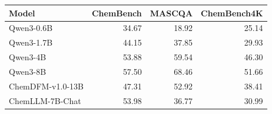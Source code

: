 \begin{tabular}{lrrr}
\hline
Model & ChemBench & MASCQA & ChemBench4K \\
\hline
Qwen3-0.6B & 34.67 & 18.92 & 25.14 \\
Qwen3-1.7B & 44.15 & 37.85 & 29.93 \\
Qwen3-4B & 53.88 & 59.54 & 46.30 \\
Qwen3-8B & 57.50 & 68.46 & 51.66 \\
ChemDFM-v1.0-13B & 47.31 & 52.92 & 38.41 \\
ChemLLM-7B-Chat & 53.98 & 36.77 & 30.99 \\
\hline
\end{tabular}
